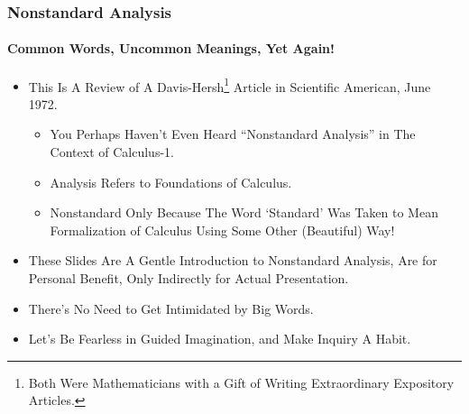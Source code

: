\begin{frame}
\frametitle{Nonstandard Analysis}
\framesubtitle{Common Words, Uncommon Meanings, Yet Again!}
\label{slide:nonstd-anal}
\begin{itemize}
\pause
\item This Is A Review of A Davis-Hersh\footnote{Both Were Mathematicians with a Gift of Writing Extraordinary Expository Articles.} Article in Scientific American, June 1972.
\begin{itemize}
\pause
\item You Perhaps Haven't Even Heard \alert{``Nonstandard Analysis''} in The Context of Calculus-1.
\pause
\item \alert{Analysis} Refers to \alert{Foundations of Calculus}.
\item \alert{Nonstandard} Only Because The Word \alert{`Standard' Was Taken} to Mean Formalization of Calculus Using Some Other (Beautiful) Way!
\end{itemize}
\pause
\item These Slides Are A Gentle Introduction to Nonstandard Analysis, Are for Personal Benefit, Only Indirectly for Actual Presentation.
\pause
\item There's No Need to Get Intimidated by \alert{Big Words}.
\pause
\item Let's Be Fearless in Guided Imagination, and Make \alert{Inquiry} A Habit.
\end{itemize}
\end{frame}
